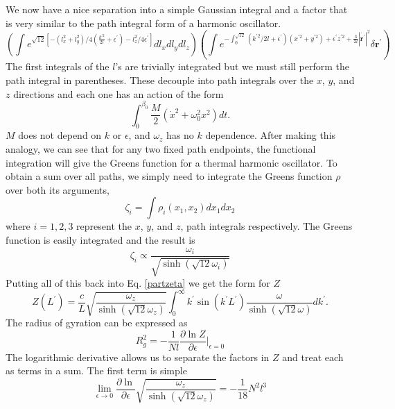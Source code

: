 \documentclass[11pt]{ucthesis}
\begin{document}
We now have a nice separation into a simple Gaussian integral and a factor that is very similar to the path integral form of a harmonic oscillator. 
\begin{equation}
(\int e^{\sqrt{12}[ -(l_x^2 + l_y^2)/4(\frac{k^{\prime2}}{2l} +\epsilon^\prime) - l_z^2/4\epsilon^\prime]}dl_xdl_ydl_z)  (\int e^{-\int_0^{\sqrt{12}} (k^{\prime2}/2l + \epsilon^\prime)(x^{\prime2} + y^{\prime2} ) + \epsilon^\prime z^{\prime2}  + \frac{3}{2l} |\dot{\mathbf{r}^\prime}|^2 } \delta \mathbf{r}^\prime)
\end{equation}
The first integrals of the $l$'s are trivially integrated but we must still perform the path integral in parentheses. 
These decouple into path integrals over the $x$, $y$, and $z$ directions and each one has an action of the form
\begin{equation}
\int_0^{\beta_0} \frac{M}{2}(\dot{x}^2 + \omega_0^2 x^2)dt .
\end{equation}
$M$ does not depend on $k$ or $\epsilon$, and $\omega_z$ has no $k$ dependence.
After making this analogy, we can see that for any two fixed path endpoints, the functional integration will give the Greens function for a thermal harmonic oscillator. To obtain a sum over all paths, we simply need to integrate the Greens function $\rho$ ~\cite{feynman} over both its arguments,
\begin{equation}
\zeta_i = \int \rho_i(x_1,x_2)dx_1dx_2
\end{equation}
where $i = 1,2,3$ represent the $x$, $y$, and $z$, path integrals respectively.
The Greens function is easily integrated and the result is 
\begin{equation}\label{eqn:zomega}
\zeta_i \propto \frac{\omega_i}{\sqrt{ \sinh{(\sqrt{12}\omega_i)}}}
\end{equation}
Putting all of this back into Eq. \ref{partzeta} we get the form for $Z$
\begin{equation}
Z(L^\prime) = \frac{c}{L} \sqrt{\frac{\omega_z}{\sinh{(\sqrt{12}\omega_z)}}} \int_0^\infty k^\prime \sin(k^\prime L^\prime) \frac{\omega}{\sinh(\sqrt{12}\omega)} dk^\prime .
\end{equation}
The radius of gyration can be expressed as
\begin{equation}
R_g^2 = -\frac{1}{Nl}\frac{\partial \ln Z}{\partial \epsilon}\vert_{\epsilon=0}
\end{equation}
The logarithmic derivative allows us to separate the factors in $Z$ and treat each as terms in a sum.
The first term is simple
\begin{equation}
\lim_{\epsilon\to0}\frac{\partial \ln}{\partial \epsilon}\sqrt{\frac{\omega_z}{\sinh{(\sqrt{12}\omega_z)}}} = -\frac{1}{18}N^2l^3
\end{equation}
\end{document}
